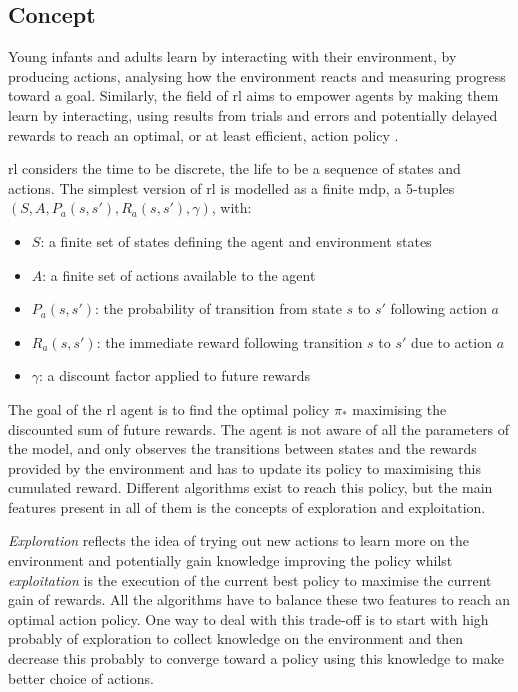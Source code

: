 \subsection{Concept}
	Young infants and adults learn by interacting with their environment, by producing actions, analysing how the environment reacts and measuring progress toward a goal. Similarly, the field of \acrfull{rl} aims to empower agents by making them learn by interacting, using results from trials and errors and potentially delayed rewards to reach an optimal, or at least efficient, action policy \citep{sutton1998reinforcement}.

	\gls{rl} considers the time to be discrete, the life to be a sequence of states and actions.	The simplest version of \gls{rl} is modelled as a finite \acrfull{mdp}, a 5-tuples $(S, A, P_a(s,s'), R_a(s,s'), \gamma)$, with:
	\begin{itemize}
		\item $S$: a finite set of states defining the agent and environment states
		\item $A$: a finite set of actions available to the agent
		\item $P_a(s,s')$: the probability of transition from state $s$ to $s'$ following action $a$
		\item $R_a(s,s')$: the immediate reward following transition $s$ to $s'$ due to action $a$
		\item $\gamma$: a discount factor applied to future rewards
	\end{itemize}

	The goal of the \gls{rl} agent is to find the optimal policy $\pi_*$ maximising the discounted sum of future rewards. The agent is not aware of all the parameters of the model, and only observes the transitions between states and the rewards provided by the environment and has to update its policy to maximising this cumulated reward. Different algorithms exist to reach this policy, but the main features present in all of them is the concepts of exploration and exploitation.
	
	\textit{Exploration} reflects the idea of trying out new actions to learn more on the environment and potentially gain knowledge improving the policy whilst \textit{exploitation} is the execution of the current best policy to maximise the current gain of rewards. All the algorithms have to balance these two features to reach an optimal action policy. One way to deal with this trade-off is to start with high probably of exploration to collect knowledge on the environment and then decrease this probably to converge toward a policy using this knowledge to make better choice of actions.
	
